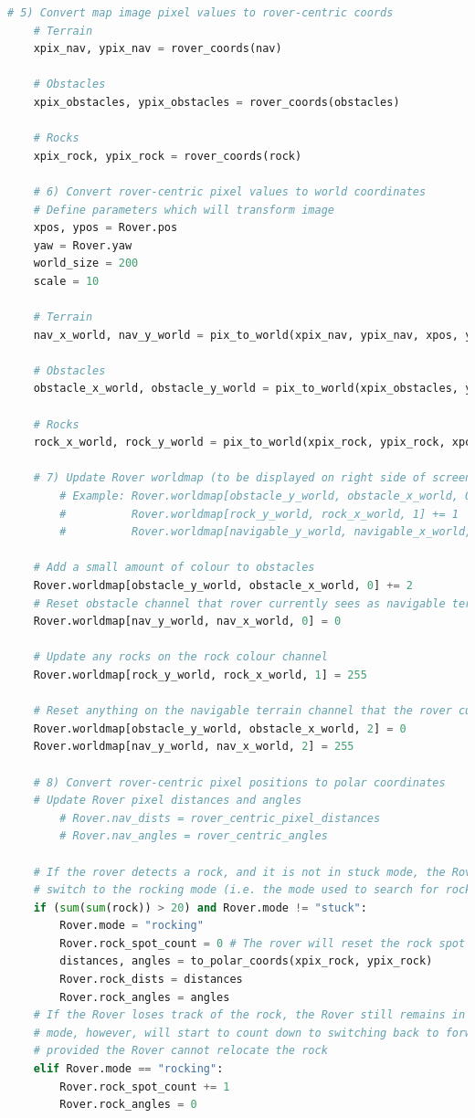 \documentclass[a4paper]{article}
\begin{document}
\begin{lstlisting}[language=Python]
    # 5) Convert map image pixel values to rover-centric coords
    # Terrain
    xpix_nav, ypix_nav = rover_coords(nav)
    
    # Obstacles
    xpix_obstacles, ypix_obstacles = rover_coords(obstacles)
    
    # Rocks
    xpix_rock, ypix_rock = rover_coords(rock)
    
    # 6) Convert rover-centric pixel values to world coordinates
    # Define parameters which will transform image
    xpos, ypos = Rover.pos
    yaw = Rover.yaw
    world_size = 200
    scale = 10
    
    # Terrain
    nav_x_world, nav_y_world = pix_to_world(xpix_nav, ypix_nav, xpos, ypos, yaw, world_size, scale)
    
    # Obstacles
    obstacle_x_world, obstacle_y_world = pix_to_world(xpix_obstacles, ypix_obstacles, xpos, ypos, yaw, world_size, scale)
    
    # Rocks
    rock_x_world, rock_y_world = pix_to_world(xpix_rock, ypix_rock, xpos, ypos, yaw, world_size, scale)
    
    # 7) Update Rover worldmap (to be displayed on right side of screen)
        # Example: Rover.worldmap[obstacle_y_world, obstacle_x_world, 0] += 1
        #          Rover.worldmap[rock_y_world, rock_x_world, 1] += 1
        #          Rover.worldmap[navigable_y_world, navigable_x_world, 2] += 1
    
    # Add a small amount of colour to obstacles
    Rover.worldmap[obstacle_y_world, obstacle_x_world, 0] += 2
    # Reset obstacle channel that rover currently sees as navigable terrain
    Rover.worldmap[nav_y_world, nav_x_world, 0] = 0
    
    # Update any rocks on the rock colour channel
    Rover.worldmap[rock_y_world, rock_x_world, 1] = 255 
    
    # Reset anything on the navigable terrain channel that the rover currently sees as an obstacle
    Rover.worldmap[obstacle_y_world, obstacle_x_world, 2] = 0
    Rover.worldmap[nav_y_world, nav_x_world, 2] = 255
    
    # 8) Convert rover-centric pixel positions to polar coordinates
    # Update Rover pixel distances and angles
        # Rover.nav_dists = rover_centric_pixel_distances
        # Rover.nav_angles = rover_centric_angles
    
    # If the rover detects a rock, and it is not in stuck mode, the Rover will
    # switch to the rocking mode (i.e. the mode used to search for rocks)
    if (sum(sum(rock)) > 20) and Rover.mode != "stuck":
        Rover.mode = "rocking"
        Rover.rock_spot_count = 0 # The rover will reset the rock spot counter
        distances, angles = to_polar_coords(xpix_rock, ypix_rock)
        Rover.rock_dists = distances
        Rover.rock_angles = angles
    # If the Rover loses track of the rock, the Rover still remains in the rocking
    # mode, however, will start to count down to switching back to forward mode
    # provided the Rover cannot relocate the rock
    elif Rover.mode == "rocking":
        Rover.rock_spot_count += 1
        Rover.rock_angles = 0
    

\end{lstlisting}
\end{document}
